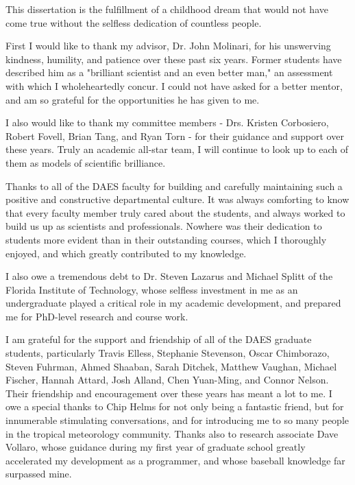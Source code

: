  


\indent \indent This dissertation is the fulfillment of a childhood dream that would not have come true without the selfless dedication of countless people.

First I would like to thank my advisor, Dr. John Molinari, for his unswerving kindness, humility, and patience over these past six years.  
Former students have described him as a "brilliant scientist and an even better man," an assessment with which I wholeheartedly concur.  
I could not have asked for a better mentor, and am so grateful for the opportunities he has given to me.

I also would like to thank my committee members - Drs. Kristen Corbosiero, Robert Fovell, Brian Tang, and Ryan Torn - for their guidance and support over these years.  
Truly an academic all-star team, I will continue to look up to each of them as models of scientific brilliance.

Thanks to all of the DAES faculty for building and carefully maintaining such a positive and constructive departmental culture.  
It was always comforting to know that every faculty member truly cared about the students, and always worked to build us up as scientists and professionals.  
Nowhere was their dedication to students more evident than in their outstanding courses, which I thoroughly enjoyed, and which greatly contributed to my knowledge.  

I also owe a tremendous debt to Dr. Steven Lazarus and Michael Splitt of the Florida Institute of Technology, whose selfless investment in me as an undergraduate played a critical role in my academic development, and prepared me for PhD-level research and course work.

I am grateful for the support and friendship of all of the DAES graduate students, particularly Travis Elless, Stephanie Stevenson, Oscar Chimborazo, Steven Fuhrman, Ahmed Shaaban, Sarah Ditchek, Matthew Vaughan, Michael Fischer, Hannah Attard, Josh Alland, Chen Yuan-Ming, and Connor Nelson.  
Their friendship and encouragement over these years has meant a lot to me.
I owe a special thanks to Chip Helms for not only being a fantastic friend, but for innumerable stimulating conversations, and for introducing me to so many people in the tropical meteorology community.  
Thanks also to research associate Dave Vollaro, whose guidance during my first year of graduate school greatly accelerated my development as a programmer, and whose baseball knowledge far surpassed mine.

